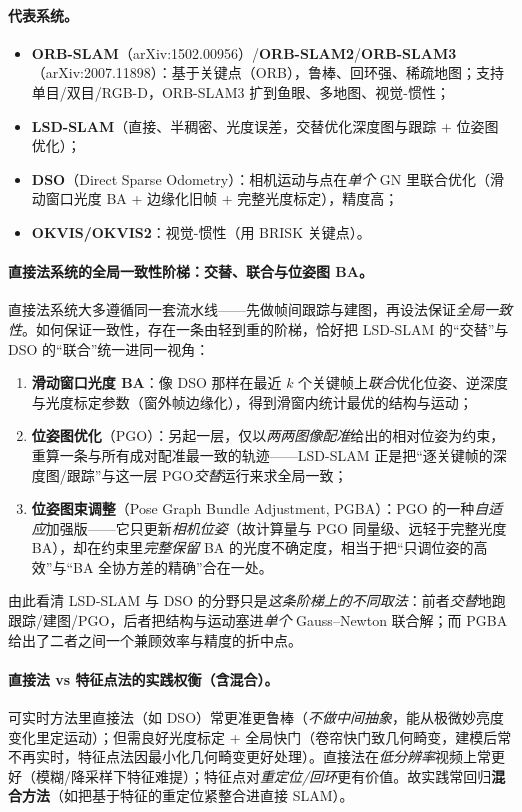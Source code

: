 \paragraph{代表系统\cite{carlone2026handbook}。}
\begin{itemize}
  \item \textbf{ORB-SLAM}（arXiv:1502.00956）/\textbf{ORB-SLAM2}/\textbf{ORB-SLAM3}（arXiv:2007.11898）：基于关键点（ORB），鲁棒、回环强、稀疏地图；支持单目/双目/RGB-D，ORB-SLAM3 扩到鱼眼、多地图、视觉-惯性；
  \item \textbf{LSD-SLAM}（直接、半稠密、光度误差，交替优化深度图与跟踪 + 位姿图优化）；
  \item \textbf{DSO}（Direct Sparse Odometry）：相机运动与点在\emph{单个} GN 里联合优化（滑动窗口光度 BA + 边缘化旧帧 + 完整光度标定），精度高；
  \item \textbf{OKVIS/OKVIS2}：视觉-惯性（用 BRISK 关键点）。
\end{itemize}

\paragraph{直接法系统的全局一致性阶梯：交替、联合与位姿图 BA。}直接法系统大多遵循同一套流水线——先做帧间跟踪与建图，再设法保证\emph{全局一致性}\cite{carlone2026handbook}。如何保证一致性，存在一条由轻到重的阶梯，恰好把 LSD-SLAM 的“交替”与 DSO 的“联合”统一进同一视角：
\begin{enumerate}
  \item \textbf{滑动窗口光度 BA}：像 DSO 那样在最近 $k$ 个关键帧上\emph{联合}优化位姿、逆深度与光度标定参数（窗外帧边缘化），得到滑窗内统计最优的结构与运动；
  \item \textbf{位姿图优化}（PGO）：另起一层，仅以\emph{两两图像配准}给出的相对位姿为约束，重算一条与所有成对配准最一致的轨迹——LSD-SLAM 正是把“逐关键帧的深度图/跟踪”与这一层 PGO\emph{交替}运行来求全局一致；
  \item \textbf{位姿图束调整}（Pose Graph Bundle Adjustment, PGBA）\cite{carlone2026handbook}：PGO 的一种\emph{自适应}加强版——它只更新\emph{相机位姿}（故计算量与 PGO 同量级、远轻于完整光度 BA），却在约束里\emph{完整保留} BA 的光度不确定度，相当于把“只调位姿的高效”与“BA 全协方差的精确”合在一处。
\end{enumerate}
由此看清 LSD-SLAM 与 DSO 的分野只是\emph{这条阶梯上的不同取法}：前者\emph{交替}地跑跟踪/建图/PGO，后者把结构与运动塞进\emph{单个} Gauss--Newton 联合解；而 PGBA 给出了二者之间一个兼顾效率与精度的折中点。

\paragraph{直接法 vs 特征点法的实践权衡（含混合）\cite{carlone2026handbook}。}可实时方法里直接法（如 DSO）常更准更鲁棒（\emph{不做中间抽象}，能从极微妙亮度变化里定运动）；但需良好光度标定 + 全局快门（卷帘快门致几何畸变，建模后常不再实时，特征点法因最小化几何畸变更好处理）。直接法在\emph{低分辨率}视频上常更好（模糊/降采样下特征难提）；特征点对\emph{重定位/回环}更有价值。故实践常回归\textbf{混合方法}（如把基于特征的重定位紧整合进直接 SLAM）。

